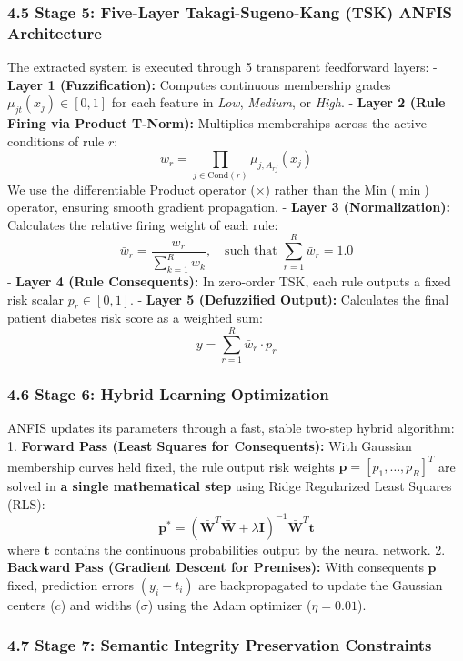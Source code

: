 \subsubsection{4.5 Stage 5: Five-Layer Takagi-Sugeno-Kang (TSK) ANFIS
Architecture}\label{stage-5-five-layer-takagi-sugeno-kang-tsk-anfis-architecture}

The extracted system is executed through 5 transparent feedforward
layers: - \textbf{Layer 1 (Fuzzification):} Computes continuous
membership grades \(\mu_{jt}(x_j) \in [0, 1]\) for each feature in
\emph{Low}, \emph{Medium}, or \emph{High}. - \textbf{Layer 2 (Rule
Firing via Product T-Norm):} Multiplies memberships across the active
conditions of rule \(r\):
\[w_r = \prod_{j \in \text{Cond}(r)} \mu_{j, A_{rj}}(x_j)\] We use the
differentiable Product operator (\(\times\)) rather than the Min
(\(\min\)) operator, ensuring smooth gradient propagation. -
\textbf{Layer 3 (Normalization):} Calculates the relative firing weight
of each rule:
\[\bar{w}_r = \frac{w_r}{\sum_{k=1}^R w_k}, \quad \text{such that } \sum_{r=1}^R \bar{w}_r = 1.0\]
- \textbf{Layer 4 (Rule Consequents):} In zero-order TSK, each rule
outputs a fixed risk scalar \(p_r \in [0, 1]\). - \textbf{Layer 5
(Defuzzified Output):} Calculates the final patient diabetes risk score
as a weighted sum: \[y = \sum_{r=1}^R \bar{w}_r \cdot p_r\]

\subsubsection{4.6 Stage 6: Hybrid Learning
Optimization}\label{stage-6-hybrid-learning-optimization}

ANFIS updates its parameters through a fast, stable two-step hybrid
algorithm: 1. \textbf{Forward Pass (Least Squares for Consequents):}
With Gaussian membership curves held fixed, the rule output risk weights
\(\mathbf{p} = [p_1, \dots, p_R]^T\) are solved in \textbf{a single
mathematical step} using Ridge Regularized Least Squares (RLS):
\[\mathbf{p}^* = (\bar{\mathbf{W}}^T \bar{\mathbf{W}} + \lambda \mathbf{I})^{-1} \bar{\mathbf{W}}^T \mathbf{t}\]
where \(\mathbf{t}\) contains the continuous probabilities output by the
neural network. 2. \textbf{Backward Pass (Gradient Descent for
Premises):} With consequents \(\mathbf{p}\) fixed, prediction errors
\((y_i - t_i)\) are backpropagated to update the Gaussian centers
(\(c\)) and widths (\(\sigma\)) using the Adam optimizer
(\(\eta=0.01\)).

\subsubsection{4.7 Stage 7: Semantic Integrity Preservation
Constraints}\label{stage-7-semantic-integrity-preservation-constraints}

